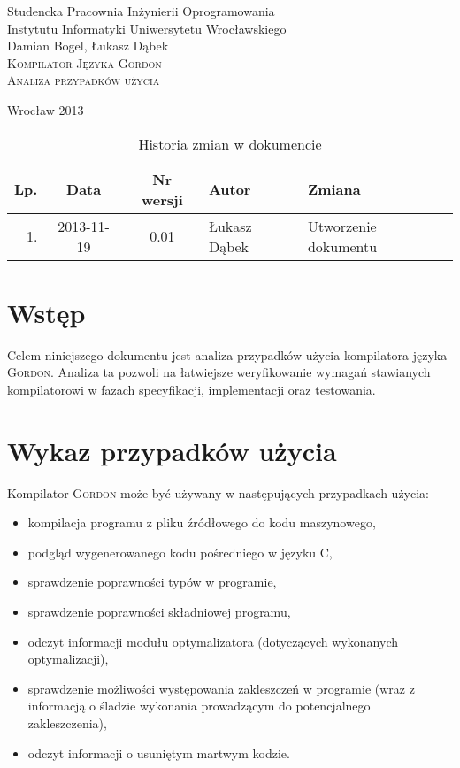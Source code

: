 \documentclass{documentation}
\begin{document}
\begin{titlepage}
\begin{center}
Studencka Pracownia Inżynierii Oprogramowania\\
Instytutu Informatyki Uniwersytetu Wrocławskiego\\[6cm]

Damian Bogel, Łukasz Dąbek\\[1cm]
\textsc{\LARGE Kompilator Języka Gordon}\\[0.5cm]
\textsc{\large Analiza przypadków użycia}

\vfill
Wrocław 2013 \\[2.5cm]

\end{center}
\end{titlepage}

\newpage
\begin{table}
	\centering
    \captionsetup{name=Tabela,labelsep=period}
	\caption{Historia zmian w dokumencie}
		\begin{tabular}{|r|c|c|l|l|}
		\hline
		Lp.  & Data       & Nr wersji & Autor                 & Zmiana \\ \hline
		1.   & 2013-11-19 & 0.01 & Łukasz Dąbek & Utworzenie dokumentu \\ \hline
	\end{tabular}
\end{table}
\newpage

\tableofcontents
\setcounter{page}{2}

\newpage

\section{Wstęp}
\noindent Celem niniejszego dokumentu jest analiza przypadków użycia kompilatora
języka \textsc{Gordon}. Analiza ta pozwoli na łatwiejsze weryfikowanie wymagań
stawianych kompilatorowi w fazach specyfikacji, implementacji oraz testowania.

\section{Wykaz przypadków użycia}
\noindent Kompilator \textsc{Gordon} może być używany w następujących przypadkach użycia:
\begin{itemize}
    \item kompilacja programu z pliku źródłowego do kodu maszynowego,
    \item podgląd wygenerowanego kodu pośredniego w języku \textsc{C},
    \item sprawdzenie poprawności typów w programie,
    \item sprawdzenie poprawności składniowej programu,
    \item odczyt informacji modułu optymalizatora (dotyczących wykonanych optymalizacji),
    \item sprawdzenie możliwości występowania zakleszczeń w programie (wraz z informacją
        o śladzie wykonania prowadzącym do potencjalnego zakleszczenia),
    \item odczyt informacji o usuniętym martwym kodzie.
\end{itemize}
\end{document}
